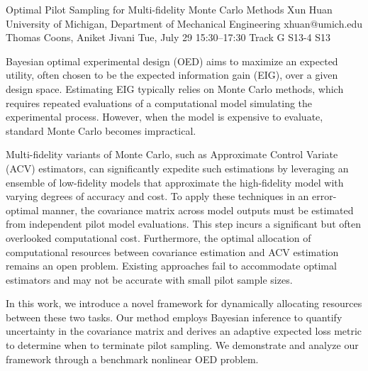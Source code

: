 \begin{talk}
  {Optimal Pilot Sampling for Multi-fidelity Monte Carlo Methods}%
  {Xun Huan}%
  {University of Michigan, Department of Mechanical Engineering}%
  {xhuan@umich.edu}%
  {Thomas Coons, Aniket Jivani}%
  {}%
  {Tue, July 29 15:30–17:30 Track G}%
  {S13-4}%
  {S13}%
  
				

Bayesian optimal experimental design (OED) aims to maximize an expected utility, often chosen to be the expected information gain (EIG), over a given design space. Estimating EIG typically relies on Monte Carlo methods, which requires repeated evaluations of a computational model simulating the experimental process. 
However, when the model is expensive to evaluate, standard Monte Carlo becomes impractical.

Multi-fidelity variants of Monte Carlo, such as Approximate Control Variate (ACV) estimators, can significantly expedite such estimations by leveraging an ensemble of low-fidelity models that approximate the high-fidelity model with varying degrees of accuracy and cost. 
To apply these techniques in an error-optimal manner, the covariance matrix across model outputs must be estimated from independent pilot model evaluations. This step incurs a significant but often overlooked computational cost. 
Furthermore, the optimal allocation of computational resources between 
covariance estimation and 
ACV estimation remains an open problem.  Existing approaches fail to accommodate optimal estimators and may not be accurate with small pilot sample sizes.

In this work, we introduce a novel framework for dynamically allocating resources between these two tasks.
Our method employs Bayesian inference
to quantify uncertainty in the covariance matrix and derives an adaptive expected loss metric
to determine when to terminate pilot sampling. 
We demonstrate and analyze our framework through a benchmark nonlinear OED problem. 


\end{talk}
